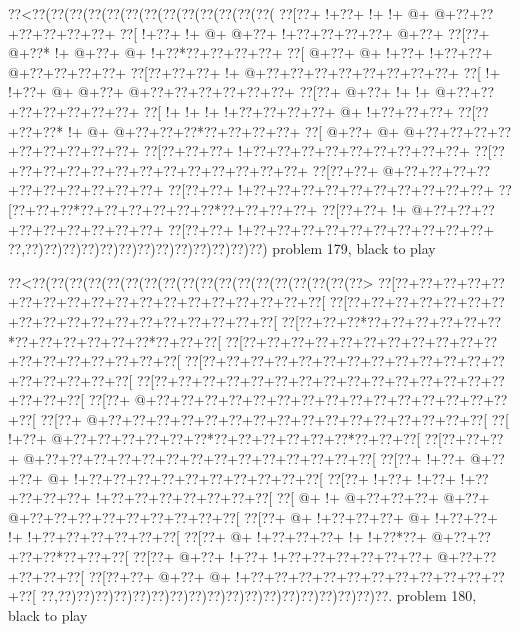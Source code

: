 \vbox{\vbox{\goo
\0??<\0??(\0??(\0??(\0??(\0??(\0??(\0??(\0??(\0??(\0??(\0??(\0??(\0??(
\0??[\0??+\- !+\0??+\- !+\- !+\- @+\- @+\0??+\0??+\0??+\0??+\0??+\0??+
\0??[\- !+\0??+\- !+\- @+\- @+\0??+\- !+\0??+\0??+\0??+\0??+\- @+\0??+
\0??[\0??+\- @+\0??*\- !+\- @+\0??+\- @+\- !+\0??*\0??+\0??+\0??+\0??+
\0??[\- @+\0??+\- @+\- !+\0??+\- !+\0??+\0??+\- @+\0??+\0??+\0??+\0??+
\0??[\0??+\0??+\0??+\- !+\- @+\0??+\0??+\0??+\0??+\0??+\0??+\0??+\0??+
\0??[\- !+\- !+\0??+\- @+\- @+\0??+\- @+\0??+\0??+\0??+\0??+\0??+\0??+
\0??[\0??+\- @+\0??+\- !+\- !+\- @+\0??+\0??+\0??+\0??+\0??+\0??+\0??+
\0??[\- !+\- !+\- !+\- !+\0??+\0??+\0??+\0??+\- @+\- !+\0??+\0??+\0??+
\0??[\0??+\0??+\0??*\- !+\- @+\- @+\0??+\0??+\0??*\0??+\0??+\0??+\0??+
\0??[\- @+\0??+\- @+\- @+\0??+\0??+\0??+\0??+\0??+\0??+\0??+\0??+\0??+
\0??[\0??+\0??+\0??+\- !+\0??+\0??+\0??+\0??+\0??+\0??+\0??+\0??+\0??+
\0??[\0??+\0??+\0??+\0??+\0??+\0??+\0??+\0??+\0??+\0??+\0??+\0??+\0??+
\0??[\0??+\0??+\- @+\0??+\0??+\0??+\0??+\0??+\0??+\0??+\0??+\0??+\0??+
\0??[\0??+\0??+\- !+\0??+\0??+\0??+\0??+\0??+\0??+\0??+\0??+\0??+\0??+
\0??[\0??+\0??+\0??*\0??+\0??+\0??+\0??+\0??+\0??*\0??+\0??+\0??+\0??+
\0??[\0??+\0??+\- !+\- @+\0??+\0??+\0??+\0??+\0??+\0??+\0??+\0??+\0??+
\0??[\0??+\0??+\- !+\0??+\0??+\0??+\0??+\0??+\0??+\0??+\0??+\0??+\0??+
\0??,\0??)\0??)\0??)\0??)\0??)\0??)\0??)\0??)\0??)\0??)\0??)\0??)\0??)
}
\hfil problem 179, black to play\hfil\break
}

\vbox{\vbox{\goo
\0??<\0??(\0??(\0??(\0??(\0??(\0??(\0??(\0??(\0??(\0??(\0??(\0??(\0??(\0??(\0??(\0??(\0??(\0??>
\0??[\0??+\0??+\0??+\0??+\0??+\0??+\0??+\0??+\0??+\0??+\0??+\0??+\0??+\0??+\0??+\0??+\0??+\0??[
\0??[\0??+\0??+\0??+\0??+\0??+\0??+\0??+\0??+\0??+\0??+\0??+\0??+\0??+\0??+\0??+\0??+\0??+\0??[
\0??[\0??+\0??+\0??*\0??+\0??+\0??+\0??+\0??+\0??*\0??+\0??+\0??+\0??+\0??+\0??*\0??+\0??+\0??[
\0??[\0??+\0??+\0??+\0??+\0??+\0??+\0??+\0??+\0??+\0??+\0??+\0??+\0??+\0??+\0??+\0??+\0??+\0??[
\0??[\0??+\0??+\0??+\0??+\0??+\0??+\0??+\0??+\0??+\0??+\0??+\0??+\0??+\0??+\0??+\0??+\0??+\0??[
\0??[\0??+\0??+\0??+\0??+\0??+\0??+\0??+\0??+\0??+\0??+\0??+\0??+\0??+\0??+\0??+\0??+\0??+\0??[
\0??[\0??+\- @+\0??+\0??+\0??+\0??+\0??+\0??+\0??+\0??+\0??+\0??+\0??+\0??+\0??+\0??+\0??+\0??[
\0??[\0??+\- @+\0??+\0??+\0??+\0??+\0??+\0??+\0??+\0??+\0??+\0??+\0??+\0??+\0??+\0??+\0??+\0??[
\0??[\- !+\0??+\- @+\0??+\0??+\0??+\0??+\0??+\0??*\0??+\0??+\0??+\0??+\0??+\0??*\0??+\0??+\0??[
\0??[\0??+\0??+\0??+\- @+\0??+\0??+\0??+\0??+\0??+\0??+\0??+\0??+\0??+\0??+\0??+\0??+\0??+\0??[
\0??[\0??+\- !+\0??+\- @+\0??+\0??+\- @+\- !+\0??+\0??+\0??+\0??+\0??+\0??+\0??+\0??+\0??+\0??[
\0??[\0??+\- !+\0??+\- !+\0??+\- !+\0??+\0??+\0??+\0??+\- !+\0??+\0??+\0??+\0??+\0??+\0??+\0??[
\0??[\- @+\- !+\- @+\0??+\0??+\0??+\- @+\0??+\- @+\0??+\0??+\0??+\0??+\0??+\0??+\0??+\0??+\0??[
\0??[\0??+\- @+\- !+\0??+\0??+\0??+\- @+\- !+\0??+\0??+\- !+\- !+\0??+\0??+\0??+\0??+\0??+\0??[
\0??[\0??+\- @+\- !+\0??+\0??+\0??+\- !+\- !+\0??*\0??+\- @+\0??+\0??+\0??+\0??*\0??+\0??+\0??[
\0??[\0??+\- @+\0??+\- !+\0??+\- !+\0??+\0??+\0??+\0??+\0??+\0??+\- @+\0??+\0??+\0??+\0??+\0??[
\0??[\0??+\0??+\- @+\0??+\- @+\- !+\0??+\0??+\0??+\0??+\0??+\0??+\0??+\0??+\0??+\0??+\0??+\0??[
\0??,\0??)\0??)\0??)\0??)\0??)\0??)\0??)\0??)\0??)\0??)\0??)\0??)\0??)\0??)\0??)\0??)\0??)\0??.
}
\hfil problem 180, black to play\hfil\break
}

